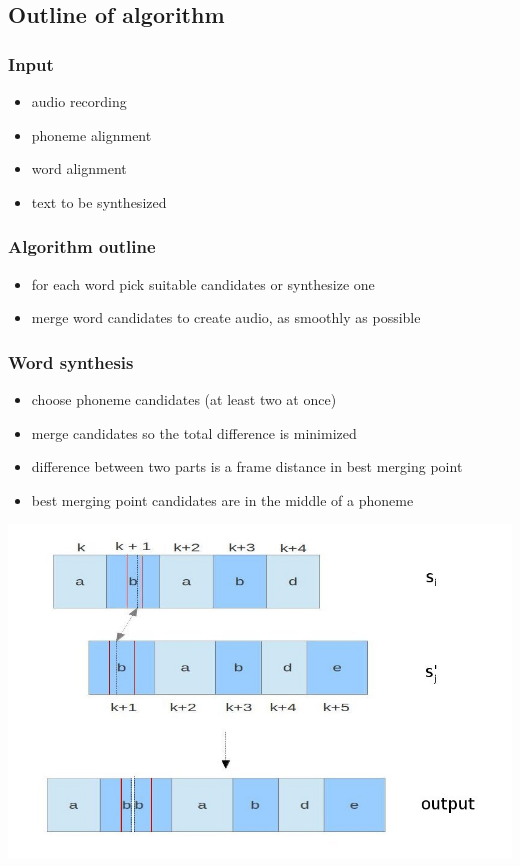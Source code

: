 \documentclass[]{beamer}
\begin{document}
\subsection{Outline of algorithm}
\begin{frame}
    \frametitle{Input}
    \begin{itemize}
        \item audio recording
        \item phoneme alignment
        \item word alignment
        \item text to be synthesized
    \end{itemize}
\end{frame}
\begin{frame}
    \frametitle{Algorithm outline}
    \begin{itemize}
        \item for each word pick suitable candidates or synthesize one
        \item merge word candidates to create audio, as smoothly as possible
    \end{itemize}
\end{frame}
\begin{frame}
    \frametitle{Word synthesis}
    \begin{itemize}
        \item choose phoneme candidates (at least two at once)
        \item merge candidates so the total difference is minimized
        \item difference between two parts is a frame distance in best merging point
        \item best merging point candidates are in the middle of a phoneme
    \end{itemize}
\end{frame}
\begin{frame}
    \includegraphics[scale=0.37]{audio_merging.jpg}
\end{frame}
\end{document}
